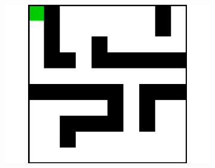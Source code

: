 \documentclass{article}
\begin{document}
\begin{figure}[t]
\begin{subfigure}[t]{0.18\textwidth}
    \includegraphics[width=\textwidth]{images/maze/maze9.pdf}
    \caption{}
  \end{subfigure}
  

\end{figure}
\end{document}
